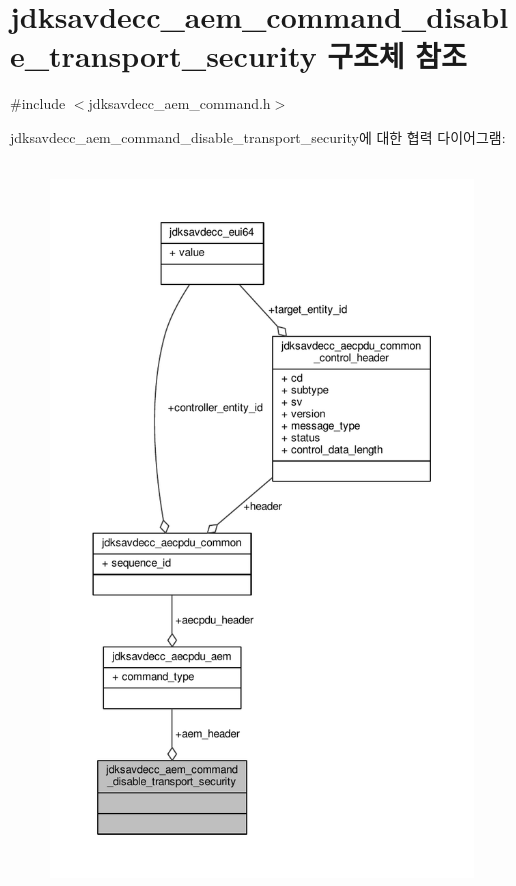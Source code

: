 \hypertarget{structjdksavdecc__aem__command__disable__transport__security}{}\section{jdksavdecc\+\_\+aem\+\_\+command\+\_\+disable\+\_\+transport\+\_\+security 구조체 참조}
\label{structjdksavdecc__aem__command__disable__transport__security}


{\ttfamily \#include $<$jdksavdecc\+\_\+aem\+\_\+command.\+h$>$}



jdksavdecc\+\_\+aem\+\_\+command\+\_\+disable\+\_\+transport\+\_\+security에 대한 협력 다이어그램\+:
\nopagebreak
\begin{figure}[H]
\begin{center}
\leavevmode
\includegraphics[height=550pt]{structjdksavdecc__aem__command__disable__transport__security__coll__graph}
\end{center}
\end{figure}
